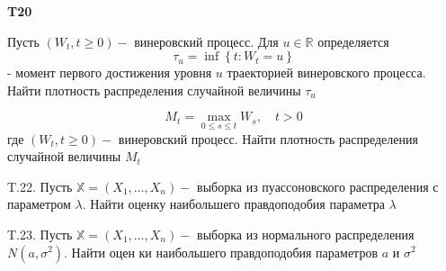 \documentclass[a4paper,12pt]{article} %
\begin{document}
\begin{example}\textbf{T20}

Пусть $\left(W_{t}, t \geq 0\right)-$ винеровский процесс. Для $u \in \mathbb{R}$ определяется
$$
\tau_{u}=\inf \left\{t: W_{t}=u\right\}
$$
- момент первого достижения уровня $u$ траекторией винеровского процесса. 
Найти плотность распределения случайной величины $\tau_{u}$




\end{example}






\begin{example}

$$
M_{t}=\max _{0 \leq s \leq t} W_{s}, \quad t>0
$$
где $\left(W_{t}, t \geq 0\right)-$ винеровский процесс. Найти плотность распределения случайной величины $M_{t}$




\end{example}



\begin{example}

T.22. Пусть $\mathbb{X}=\left(X_{1}, \ldots, X_{n}\right)-$ выборка из пуассоновского распределения
с параметром $\lambda .$ Найти оценку наибольшего правдоподобия параметра
$\lambda$




\end{example}



\begin{example}

T.23. Пусть $\mathbb{X}=\left(X_{1}, \ldots, X_{n}\right)-$ выборка из нормального распределения $N\left(a, \sigma^{2}\right) .$ Найти оцен ки наибольшего правдоподобия параметров $a$ и $\sigma^{2}$




\end{example}






\printindex



\end{document}
